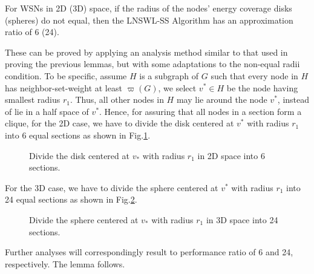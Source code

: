 \documentclass[journal,10pt]{IEEEtran}
\begin{document}
\begin{lemma}
\label{lemma_2d3d_ratio}
For WSNs in 2D (3D) space, if the radius of the nodes' energy coverage disks (spheres) do not equal, then the LNSWL-SS Algorithm has an approximation ratio of 6 (24).
\end{lemma}

\begin{IEEEproof}
These can be proved by applying an analysis method similar to that used in proving the previous lemmas, but with some adaptations to the non-equal radii condition. To be specific, assume $H$ is a subgraph of $G$ such that every node in $H$ has neighbor-set-weight at least $\varpi(G)$, we select $v^{*}{\in}H$ be the node having smallest radius $r_1$. Thus, all other nodes in $H$ may lie around the node $v^{*}$, instead of lie in a half space of $v^{*}$. Hence, for assuring that all nodes in a section form a clique, for the 2D case, we have to divide the disk centered at $v^{*}$ with radius $r_1$ into 6 equal sections as shown in Fig.\ref{fig_2d6part}.

\begin{figure}[htb]
\caption{Divide the disk centered at $v_{*}$ with radius $r_1$ in 2D space into 6 sections.}
\label{fig_2d6part}
\end{figure}

For the 3D case, we have to divide the sphere centered at $v^{*}$ with radius $r_1$ into 24 equal sections as shown in Fig.\ref{fig_3d24part}.

\begin{figure}[htb]
\caption{Divide the sphere centered at $v_{*}$ with radius $r_1$ in 3D space into 24 sections.}
\label{fig_3d24part}
\end{figure}

Further analyses will correspondingly result to performance ratio of 6 and 24, respectively. The lemma follows.

\end{IEEEproof}
\end{document}
